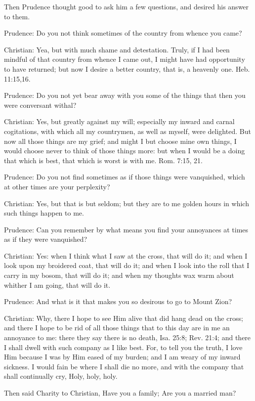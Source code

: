 Then Prudence thought good to ask him a few questions, and desired his answer to them.

Prudence: Do you not think sometimes of the country from whence you came?

Christian: Yea, but with much shame and detestation. Truly, if I had been mindful of that country from whence I came out, I might have had opportunity to have returned; but now I desire a better country, that is, a heavenly one. Heb. 11:15,16.

Prudence: Do you not yet bear away with you some of the things that then you were conversant withal?

Christian: Yes, but greatly against my will; especially my inward and carnal cogitations, with which all my countrymen, as well as myself, were delighted. But now all those things are my grief; and might I but choose mine own things, I would choose never to think of those things more: but when I would be a doing that which is best, that which is worst is with me. Rom. 7:15, 21.

Prudence: Do you not find sometimes as if those things were vanquished, which at other times are your perplexity?

Christian: Yes, but that is but seldom; but they are to me golden hours in which such things happen to me.

Prudence: Can you remember by what means you find your annoyances at times as if they were vanquished?

Christian: Yes: when I think what I saw at the cross, that will do it; and when I look upon my broidered coat, that will do it; and when I look into the roll that I carry in my bosom, that will do it; and when my thoughts wax warm about whither I am going, that will do it.

Prudence: And what is it that makes you so desirous to go to Mount Zion?

Christian: Why, there I hope to see Him alive that did hang dead on the cross; and there I hope to be rid of all those things that to this day are in me an annoyance to me: there they say there is no death, Isa. 25:8; Rev. 21:4; and there I shall dwell with such company as I like best. For, to tell you the truth, I love Him because I was by Him eased of my burden; and I am weary of my inward sickness. I would fain be where I shall die no more, and with the company that shall continually cry, Holy, holy, holy.

Then said Charity to Christian, Have you a family; Are you a married man?

